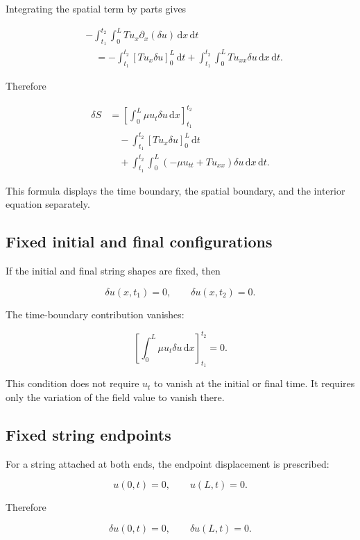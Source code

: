 Integrating the spatial term by parts gives

\[
\begin{aligned}
&-
\int_{t_{1}}^{t_{2}}
\int_{0}^{L}
T u_{x}\partial_{x}(\delta u)
\,\mathrm{d}x\,\mathrm{d}t\\
&\quad=
-
\int_{t_{1}}^{t_{2}}
\left[
T u_{x}\delta u
\right]_{0}^{L}
\,\mathrm{d}t
+
\int_{t_{1}}^{t_{2}}
\int_{0}^{L}
T u_{xx}\delta u
\,\mathrm{d}x\,\mathrm{d}t.
\end{aligned}
\]

Therefore

\[
\begin{aligned}
\delta S
&=
\left[
\int_{0}^{L}
\mu u_{t}\delta u
\,\mathrm{d}x
\right]_{t_{1}}^{t_{2}}\\
&\quad-
\int_{t_{1}}^{t_{2}}
\left[
T u_{x}\delta u
\right]_{0}^{L}
\,\mathrm{d}t\\
&\quad+
\int_{t_{1}}^{t_{2}}
\int_{0}^{L}
(-\mu u_{tt}+T u_{xx})
\delta u
\,\mathrm{d}x\,\mathrm{d}t.
\end{aligned}
\]

This formula displays the time boundary, the spatial boundary, and the interior equation separately.

\subsection{Fixed initial and final configurations}

If the initial and final string shapes are fixed, then

\[
\delta u(x,t_{1})=0,
\qquad
\delta u(x,t_{2})=0.
\]

The time-boundary contribution vanishes:

\[
\left[
\int_{0}^{L}
\mu u_{t}\delta u
\,\mathrm{d}x
\right]_{t_{1}}^{t_{2}}
=0.
\]

This condition does not require \(u_{t}\) to vanish at the initial or final time. It requires only the variation of the field value to vanish there.

\subsection{Fixed string endpoints}

For a string attached at both ends, the endpoint displacement is prescribed:

\[
u(0,t)=0,
\qquad
u(L,t)=0.
\]

Therefore

\[
\delta u(0,t)=0,
\qquad
\delta u(L,t)=0.
\]

